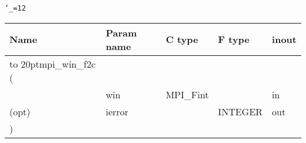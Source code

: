 \begingroup\tt\catcode`\_=12
\begin{tabular}{lllll}
\toprule
\textrm{Name}&\textrm{Param name}&\textrm{C type}&\textrm{F type}&\textrm{inout}\\
\midrule
\hbox to 20pt{mpi_win_f2c (\hss} \\
&win&MPI_Fint&&in\\
(opt)&ierror&&INTEGER&out\\
)\\
\bottomrule
\end{tabular}
\endgroup

